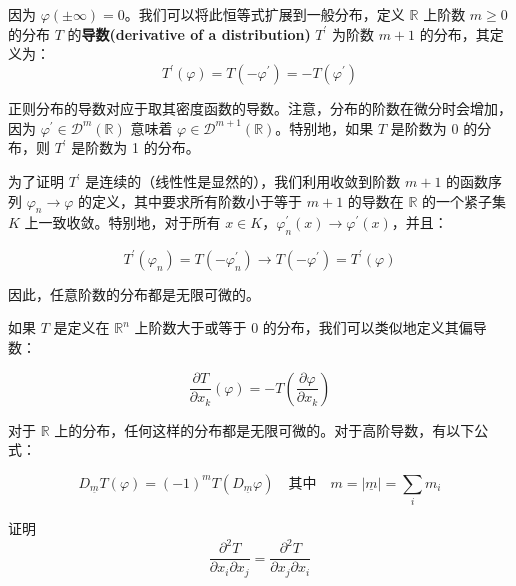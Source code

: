 因为 $\varphi(\pm \infty) = 0$。我们可以将此恒等式扩展到一般分布，定义
$\mathbb{R}$ 上阶数 $m \geq 0$ 的分布 $T$ 的\textbf{导数(derivative of a distribution)}
$T^{\prime}$ 为阶数 $m+1$ 的分布，其定义为：
\begin{equation}
  T^{\prime}(\varphi) = T\left(-\varphi^{\prime}\right) = -T\left(\varphi^{\prime}\right)
\end{equation}


正则分布的导数对应于取其密度函数的导数。注意，分布的阶数在微分时会增加，因为
$\varphi^{\prime} \in \mathcal{D}^m(\mathbb{R})$ 意味着
$\varphi \in \mathcal{D}^{m+1}(\mathbb{R})$。特别地，如果 $T$
是阶数为 0 的分布，则 $T^{\prime}$ 是阶数为 1 的分布。

为了证明 $T^{\prime}$ 是连续的（线性性是显然的），我们利用收敛到阶数
$m+1$ 的函数序列 $\varphi_n \to \varphi$
的定义，其中要求所有阶数小于等于 $m+1$ 的导数在 $\mathbb{R}$
的一个紧子集 $K$ 上一致收敛。特别地，对于所有
$x \in K$，$\varphi_n^{\prime}(x) \to \varphi^{\prime}(x)$，并且：

$$
T^{\prime}(\varphi_n) = T\left(-\varphi_n^{\prime}\right) \to T\left(-\varphi^{\prime}\right) = T^{\prime}(\varphi)
$$

因此，任意阶数的分布都是无限可微的。

如果 $T$ 是定义在 $\mathbb{R}^n$ 上阶数大于或等于 0
的分布，我们可以类似地定义其偏导数：

$$
\frac{\partial T}{\partial x_k}(\varphi) = -T\left(\frac{\partial \varphi}{\partial x_k}\right)
$$

对于 $\mathbb{R}$
上的分布，任何这样的分布都是无限可微的。对于高阶导数，有以下公式：

$$
D_{\underline{m}} T(\varphi) = (-1)^m T\left(D_{\underline{m}} \varphi\right) \quad \text{其中} \quad m = |\underline{m}| = \sum_{i} m_i
$$
\begin{exercise}
  证明
$$
\frac{\partial^2 T}{\partial x_i \partial x_j} = \frac{\partial^2 T}{\partial x_j \partial x_i}
$$
\end{exercise}

